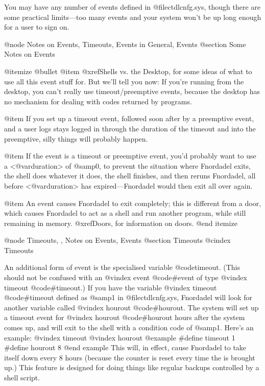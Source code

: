 You may have any number of events defined in @file{ctdlcnfg.sys},
though there are some practical limits---too many events and your
system won't be up long enough for a user to sign on.

@node Notes on Events, Timeouts, Events in General, Events
@section Some Notes on Events

@itemize @bullet
@item
@xref{Shells vs. the Desktop}, for some ideas of
what to use all this event stuff for.  But we'll tell
you now:  If you're running from the desktop, you can't
really use timeout/preemptive events, because the desktop
has no mechanism for dealing with codes returned by
programs.

@item
If you set up a timeout event, followed soon after by a
preemptive event, and a user logs stays logged in through
the duration of the timeout and into the preemptive,
silly things will probably happen.

@item
If the event is a timeout or preemptive event, you'd
probably want to use a <@var{duration}> of @samp{0}, to prevent the
situation where Fnordadel exits, the shell does
whatever it does, the shell finishes, and then reruns
Fnordadel, all before <@var{duration}> has expired---Fnordadel
would then exit all over again.

@item
An event causes Fnordadel to exit completely; this is
different from a door, which causes Fnordadel to act
as a shell and run another program, while still remaining
in memory.  @xref{Doors}, for information on doors.
@end itemize

@node Timeouts,  , Notes on Events, Events
@section Timeouts
@cindex Timeouts

An additional form of event is the specialised variable
@code{timeout}.  (This should not be confused with an
@vindex event
@code{#event} of type
@vindex timeout
@code{#timeout}.)  If you have the variable
@vindex timeout
@code{#timeout} defined as @samp{1} in
@file{ctdlcnfg.sys}, Fnordadel will look for another variable called
@vindex hourout
@code{#hourout}.  The system will set up a timeout event for
@vindex hourout
@code{#hourout}
hours after the system comes up, and will exit to the shell
with a condition code of @samp{1}.  Here's an example:
@vindex timeout
@vindex hourout
@example
#define timeout 1
#define hourout 8
@end example
This will, in effect, cause Fnordadel to take itself down
every 8 hours (because the counter is reset every time the is brought up.)
This feature is designed for doing things like regular backups controlled by
a shell script.

